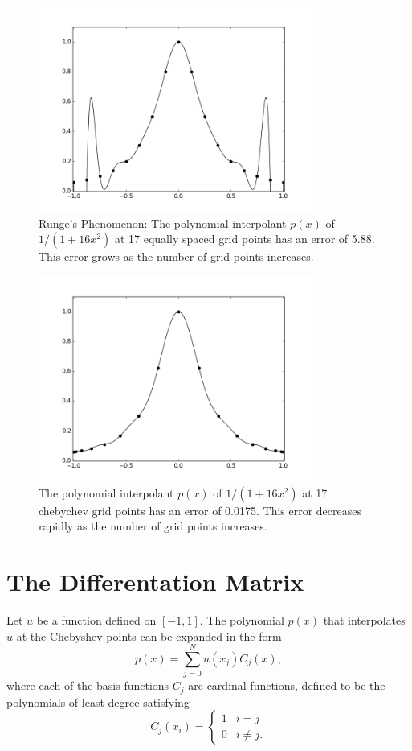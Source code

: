 \begin{figure}[ht]
\centering
\includegraphics[width=9cm]{equally_spaced_points.png}
\caption{Runge's Phenomenon: The polynomial interpolant $p(x)$ of  $1/(1+16x^2)$ at 17 equally spaced grid points has an error of 5.88.
This error grows as the number of grid points increases.}
\label{fig:Spectral1_equally_spaced_points}
\end{figure}

\begin{figure}[ht]
\centering
\includegraphics[width=9cm]{chebychev_points.png}
\caption{The polynomial interpolant $p(x)$ of $1/(1+16x^2)$ at 17 chebychev grid points has an error of 0.0175.
This error decreases rapidly as the number of grid points increases.}
\label{fig:Spectral1_chebychev_points}
\end{figure}

\section{The Differentation Matrix}
Let $u$ be a function defined on $[-1,1]$.
The polynomial $p(x)$ that interpolates $u$ at the Chebyshev points can be expanded in the form 
\[p(x) = \sum_{j=0}^N u(x_j)C_j(x),\]
where each of the basis functions $C_j$ are cardinal functions, defined to be the polynomials of least degree satisfying
\begin{equation*}
C_j(x_i) = \begin{cases} 1 & i=j \\ 0 & i \not = j.
   \end{cases}
\end{equation*}

